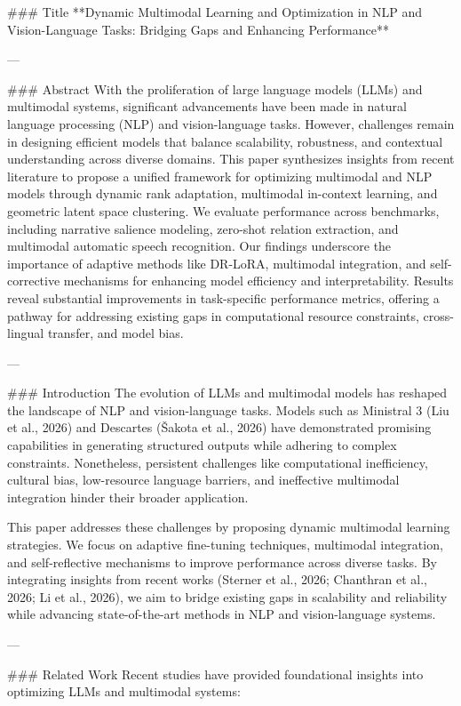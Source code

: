 ### Title
**Dynamic Multimodal Learning and Optimization in NLP and Vision-Language Tasks: Bridging Gaps and Enhancing Performance**

---

### Abstract
With the proliferation of large language models (LLMs) and multimodal systems, significant advancements have been made in natural language processing (NLP) and vision-language tasks. However, challenges remain in designing efficient models that balance scalability, robustness, and contextual understanding across diverse domains. This paper synthesizes insights from recent literature to propose a unified framework for optimizing multimodal and NLP models through dynamic rank adaptation, multimodal in-context learning, and geometric latent space clustering. We evaluate performance across benchmarks, including narrative salience modeling, zero-shot relation extraction, and multimodal automatic speech recognition. Our findings underscore the importance of adaptive methods like DR-LoRA, multimodal integration, and self-corrective mechanisms for enhancing model efficiency and interpretability. Results reveal substantial improvements in task-specific performance metrics, offering a pathway for addressing existing gaps in computational resource constraints, cross-lingual transfer, and model bias.

---

### Introduction
The evolution of LLMs and multimodal models has reshaped the landscape of NLP and vision-language tasks. Models such as Ministral 3 (Liu et al., 2026) and Descartes (Šakota et al., 2026) have demonstrated promising capabilities in generating structured outputs while adhering to complex constraints. Nonetheless, persistent challenges like computational inefficiency, cultural bias, low-resource language barriers, and ineffective multimodal integration hinder their broader application.

This paper addresses these challenges by proposing dynamic multimodal learning strategies. We focus on adaptive fine-tuning techniques, multimodal integration, and self-reflective mechanisms to improve performance across diverse tasks. By integrating insights from recent works (Sterner et al., 2026; Chanthran et al., 2026; Li et al., 2026), we aim to bridge existing gaps in scalability and reliability while advancing state-of-the-art methods in NLP and vision-language systems.

---

### Related Work
Recent studies have provided foundational insights into optimizing LLMs and multimodal systems:

